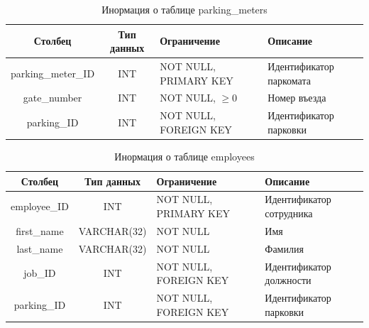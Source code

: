 \begin{table}[H]
	\begin{center}
		\begin{center}
			\caption{\label{tab:pm}Инормация о таблице parking\_meters}
		\end{center}
		\begin{tabular}{|c|c|p{3cm}|p{4cm}|}
			\hline 
			Столбец & Тип данных & Ограничение & Описание \\ \hline
			parking\_meter\_ID & INT & NOT NULL, PRIMARY KEY & Идентификатор паркомата \\ \hline
	        gate\_number & INT & NOT NULL, \( \geq 0\) & Номер въезда  \\ \hline
	        parking\_ID & INT & NOT NULL, FOREIGN KEY & Идентификатор парковки \\ \hline
		\end{tabular}
	\end{center}
\end{table}

\begin{table}[H]
	\begin{center}
		\begin{center}
			\caption{\label{tab:empl}Инормация о таблице employees}
		\end{center}
		\begin{tabular}{|c|c|p{3cm}|p{4cm}|}
			\hline 
			Столбец & Тип данных & Ограничение & Описание \\ \hline
			employee\_ID & INT & NOT NULL, PRIMARY KEY & Идентификатор
сотрудника \\ \hline
	        first\_name &  VARCHAR(32)  & NOT NULL & Имя  \\ \hline
	        last\_name &  VARCHAR(32) & NOT NULL & Фамилия  \\ \hline
	        job\_ID & INT & NOT NULL, FOREIGN KEY & Идентификатор должности \\ \hline
	        parking\_ID & INT & NOT NULL, FOREIGN KEY & Идентификатор парковки \\ \hline
		\end{tabular}
	\end{center}
\end{table}

